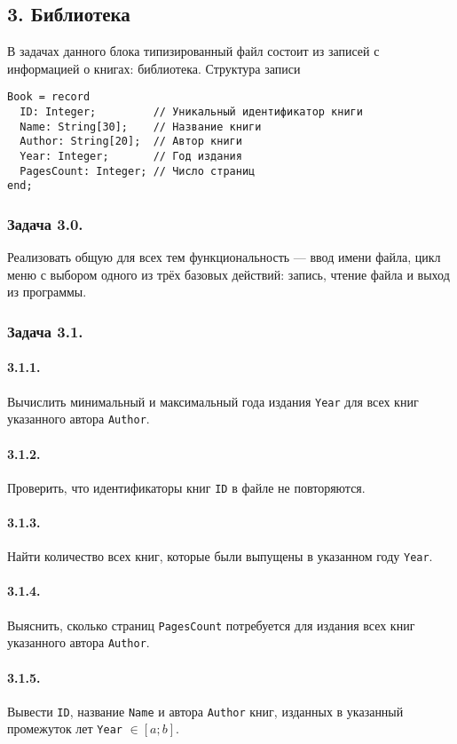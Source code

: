 \documentclass[12pt,a4paper]{report}
\begin{document}
\subsection*{3. Библиотека}
В задачах данного блока типизированный файл состоит из записей с информацией о книгах: библиотека.
Структура записи
\begin{verbatim}
Book = record
  ID: Integer;         // Уникальный идентификатор книги
  Name: String[30];    // Название книги
  Author: String[20];  // Автор книги
  Year: Integer;       // Год издания
  PagesCount: Integer; // Число страниц
end;
\end{verbatim}

\subsubsection{Задача 3.0.} Реализовать общую для всех тем функциональность --- ввод имени файла, цикл меню с выбором одного из трёх базовых действий: запись, чтение файла и выход из программы.
\subsubsection{Задача 3.1.}
\paragraph{3.1.1.} Вычислить минимальный и максимальный года издания \texttt{Year} для всех книг указанного автора \texttt{Author}.
\paragraph{3.1.2.} Проверить, что идентификаторы книг \texttt{ID} в файле не повторяются.
\paragraph{3.1.3.} Найти количество всех книг, которые были выпущены в указанном году \texttt{Year}.
\paragraph{3.1.4.} Выяснить, сколько страниц \texttt{PagesCount} потребуется для издания всех книг указанного автора \texttt{Author}.
\paragraph{3.1.5.} Вывести \texttt{ID}, название \texttt{Name} и автора \texttt{Author} книг, изданных в указанный промежуток лет \texttt{Year} $\in [a; b]$.
\end{document}
